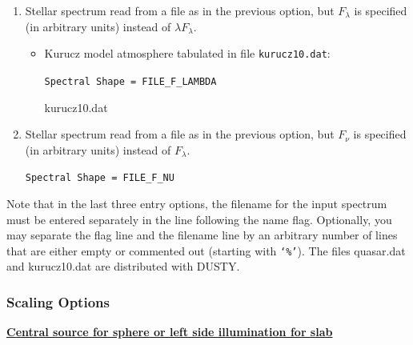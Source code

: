 \documentclass[11pt]{article}
\begin{document}
\begin{enumerate}
\begin{itemize}
{\tt Spectral Shape = FILE\_LAMBDA\_F\_LAMBDA

quasar.dat}
\end{itemize}

\item  Stellar spectrum read from a file as in the previous option, but
$F_\lambda$ is specified (in arbitrary units) instead of $\lambda F_\lambda$.

\begin{itemize}
\item Kurucz model atmosphere tabulated in file {\tt kurucz10.dat}:

{\tt Spectral Shape = FILE\_F\_LAMBDA

kurucz10.dat}
\end{itemize}

\item  Stellar spectrum read from a file as in the previous option, but
$F_\nu$ is specified (in arbitrary units) instead of $F_\lambda$.

{\tt Spectral Shape = FILE\_F\_NU}
\end{enumerate}

Note that in the last three entry options, the filename for the input spectrum
must be entered separately in the line following the name flag.
Optionally, you may separate the flag line and the filename line by an
arbitrary number of lines that are either empty or commented out (starting with
{\tt `\%'}). The files quasar.dat and kurucz10.dat are distributed with DUSTY.


\subsubsection{Scaling Options}
\label{scaling_radiation}

{\bf\underline{Central source for sphere or left side illumination for slab}}\\
\end{document}
